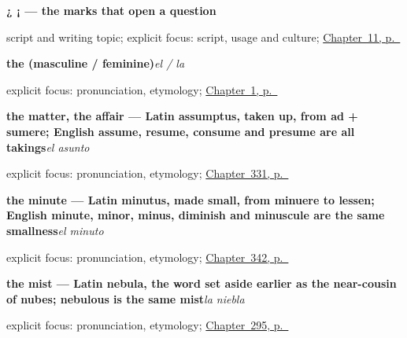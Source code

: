 \noindent\begin{minipage}[t]{\linewidth}
\raggedright
\textbf{¿ ¡ — the marks that open a question}\par
\footnotesize script and writing topic; explicit focus: script, usage and culture; \hyperref[ch:enye-and-marks]{Chapter~11, p.~\pageref*{ch:enye-and-marks}}
\end{minipage}\par\smallskip

\noindent\begin{minipage}[t]{\linewidth}
\raggedright
\textbf{the (masculine / feminine)}\enspace\emph{el / la}\par
\footnotesize explicit focus: pronunciation, etymology; \hyperref[ch:first-words]{Chapter~1, p.~\pageref*{ch:first-words}}
\end{minipage}\par\smallskip

\noindent\begin{minipage}[t]{\linewidth}
\raggedright
\textbf{the matter, the affair — Latin assumptus, taken up, from ad + sumere; English assume, resume, consume and presume are all takings}\enspace\emph{el asunto}\par
\footnotesize explicit focus: pronunciation, etymology; \hyperref[ch:manera-y-asunto]{Chapter~331, p.~\pageref*{ch:manera-y-asunto}}
\end{minipage}\par\smallskip

\noindent\begin{minipage}[t]{\linewidth}
\raggedright
\textbf{the minute — Latin minutus, made small, from minuere to lessen; English minute, minor, minus, diminish and minuscule are the same smallness}\enspace\emph{el minuto}\par
\footnotesize explicit focus: pronunciation, etymology; \hyperref[ch:el-minuto-y-el-cuarto]{Chapter~342, p.~\pageref*{ch:el-minuto-y-el-cuarto}}
\end{minipage}\par\smallskip

\noindent\begin{minipage}[t]{\linewidth}
\raggedright
\textbf{the mist — Latin nebula, the word set aside earlier as the near-cousin of nubes; nebulous is the same mist}\enspace\emph{la niebla}\par
\footnotesize explicit focus: pronunciation, etymology; \hyperref[ch:el-sendero]{Chapter~295, p.~\pageref*{ch:el-sendero}}
\end{minipage}\par\smallskip

